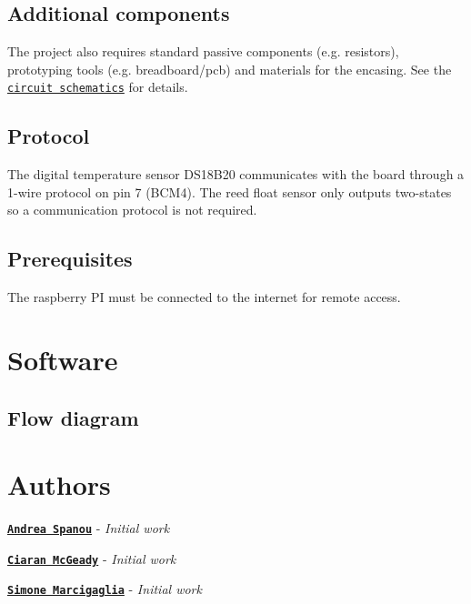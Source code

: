 \subsection*{Additional components}

The project also requires standard passive components (e.\+g. resistors), prototyping tools (e.\+g. breadboard/pcb) and materials for the encasing. See the \href{Main.sch}{\tt circuit schematics} for details.

\subsection*{Protocol}

The digital temperature sensor D\+S18\+B20 communicates with the board through a 1-\/wire protocol on pin 7 (B\+C\+M4). The reed float sensor only outputs two-\/states so a communication protocol is not required.

\subsection*{Prerequisites}

The raspberry PI must be connected to the internet for remote access.

\section*{Software}

\subsection*{Flow diagram}



\section*{Authors}


\begin{DoxyItemize}
\item \href{https://github.com/andreaspanou}{\tt {\bfseries Andrea Spanou}} -\/ {\itshape Initial work}
\item \href{https://github.com/CiaranAnthony}{\tt {\bfseries Ciaran Mc\+Geady}} -\/ {\itshape Initial work}
\item \href{https://github.com/SimoneMarcigaglia}{\tt {\bfseries Simone Marcigaglia}} -\/ {\itshape Initial work}
\end{DoxyItemize}

